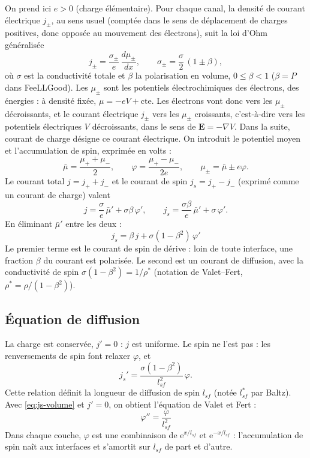\documentclass[11pt,a4paper]{article}
\newcommand{\ee}{\mathrm{e}}
\begin{document}
On prend ici $e>0$ (charge élémentaire). Pour chaque canal, la densité de
courant électrique $j_\pm$, au sens usuel (comptée dans le sens de
déplacement de charges positives, donc opposée au mouvement des électrons),
suit la loi d'Ohm généralisée
\begin{equation}
  j_\pm = \frac{\sigma_\pm}{e}\,\frac{d\mu_\pm}{dx},
  \qquad
  \sigma_\pm = \frac{\sigma}{2}\,(1\pm\beta),
  \label{eq:ohm}
\end{equation}
où $\sigma$ est la conductivité totale et $\beta$ la polarisation en
volume, $0\le\beta<1$ ($\beta = P$ dans FeeLLGood). Les $\mu_\pm$ sont les
potentiels électrochimiques des électrons, des énergies : à densité fixée,
$\mu = -eV + \text{cte}$. Les électrons vont donc vers les $\mu_\pm$
décroissants, et le courant électrique $j_\pm$ vers les $\mu_\pm$
croissants, c'est-à-dire vers les potentiels électriques $V$ décroissants,
dans le sens de $\bm{E} = -\nabla V$. Dans la suite, \og courant de
charge \fg{} désigne ce courant électrique. On introduit le potentiel moyen
et l'accumulation de spin, exprimée en volts :
\begin{equation}
  \bar\mu = \frac{\mu_++\mu_-}{2},
  \qquad
  \varphi = \frac{\mu_+-\mu_-}{2e},
  \qquad
  \mu_\pm = \bar\mu \pm e\varphi .
\end{equation}
Le courant total $j = j_++j_-$ et le courant de spin $j_s = j_+-j_-$
(exprimé comme un courant de charge) valent
\begin{equation}
  j = \frac{\sigma}{e}\,\bar\mu' + \sigma\beta\,\varphi',
  \qquad
  j_s = \frac{\sigma\beta}{e}\,\bar\mu' + \sigma\,\varphi' .
\end{equation}
En éliminant $\bar\mu'$ entre les deux :
\begin{equation}
  \boxed{\;j_s = \beta\,j + \sigma(1-\beta^2)\,\varphi'\;}
  \label{eq:js-volume}
\end{equation}
Le premier terme est le courant de spin \og de dérive\fg{} : loin de toute
interface, une fraction $\beta$ du courant est polarisée. Le second est un
courant de diffusion, avec la conductivité de spin $\sigma(1-\beta^2) =
1/\rho^*$ (notation de Valet--Fert, $\rho^* = \rho/(1-\beta^2)$).

\subsection{Équation de diffusion}

La charge est conservée, $j' = 0$ : $j$ est uniforme. Le spin ne l'est
pas : les renversements de spin font relaxer $\varphi$, et
\begin{equation}
  j_s' = \frac{\sigma(1-\beta^2)}{l_{sf}^2}\,\varphi .
\end{equation}
Cette relation définit la longueur de diffusion de spin $l_{sf}$ (notée
$l_{sf}^*$ par Baltz).
Avec \eqref{eq:js-volume} et $j' = 0$, on obtient l'équation de Valet et
Fert :
\begin{equation}
  \boxed{\;\varphi'' = \frac{\varphi}{l_{sf}^2}\;}
  \label{eq:diffusion}
\end{equation}
Dans chaque couche, $\varphi$ est une combinaison de
$\ee^{x/l_{sf}}$ et $\ee^{-x/l_{sf}}$ : l'accumulation de spin naît aux
interfaces et s'amortit sur $l_{sf}$ de part et d'autre.
\end{document}
